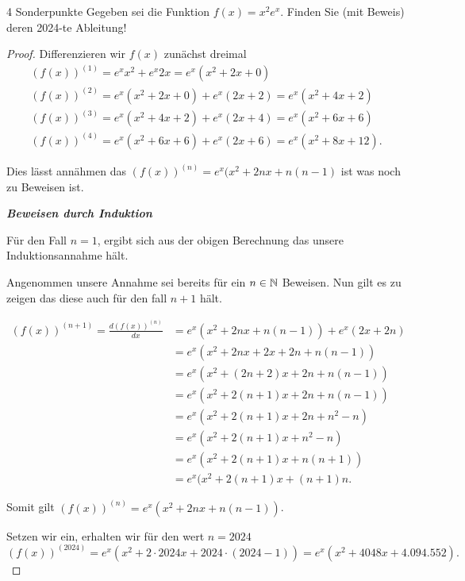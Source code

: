 \documentclass{problemset}
\begin{document}
\begin{problem}{4 Sonderpunkte}
Gegeben sei die Funktion $f(x) = x^2 e^x$. Finden Sie (mit Beweis) deren 2024-te Ableitung!

\begin{proof}
    Differenzieren wir $f(x)$ zunächst dreimal
    \begin{align*}
        (f(x))^{(1)} = e^xx^2 + e^x2x = e^x(x^2 + 2x + 0)                  \\
        (f(x))^{(2)} = e^x(x^2 + 2x + 0) + e^x(2x + 2) = e^x(x^2 + 4x + 2) \\
        (f(x))^{(3)} = e^x(x^2 + 4x + 2) + e^x(2x + 4) = e^x(x^2 + 6x + 6) \\
        (f(x))^{(4)} = e^x(x^2 + 6x + 6) + e^x(2x + 6) = e^x(x^2 + 8x + 12).
    \end{align*}

    Dies lässt annähmen das $(f(x))^{(n)} = e^x(x^2 + 2nx + n(n-1)$ ist was
    noch zu Beweisen ist.

    \textbf{\textit{Beweisen durch Induktion}}

    Für den Fall $n = 1$, ergibt sich aus der obigen Berechnung das unsere
    Induktionsannahme hält.

    Angenommen unsere Annahme sei bereits für ein $n \in \mathbb{N}$ Beweisen. Nun
    gilt es zu zeigen das diese auch für den fall $n + 1$ hält.

    \begin{align*}
        (f(x))^{(n + 1)} = \frac{d (f(x))^{(n)}}{dx} & = e^x(x^2 + 2nx + n(n-1)) + e^x(2x + 2n) \\
                                                     & = e^x(x^2 + 2nx + 2x + 2n + n(n-1))      \\
                                                     & = e^x(x^2 + (2n + 2)x + 2n + n(n-1))     \\
                                                     & = e^x(x^2 + 2(n + 1)x + 2n + n(n-1))     \\
                                                     & = e^x(x^2 + 2(n + 1)x + 2n + n^2 -n)     \\
                                                     & = e^x(x^2 + 2(n + 1)x + n^2 - n)         \\
                                                     & = e^x(x^2 + 2(n + 1)x + n(n + 1))        \\
                                                     & = e^x(x^2 + 2(n + 1)x + (n + 1)n.
    \end{align*}

    Somit gilt $(f(x))^{(n)} = e^x(x^2 + 2nx + n(n-1))$.

    Setzen wir ein, erhalten wir für den wert $n = 2024$
    \[
        (f(x))^{(2024)} = e^x(x^2 + 2 \cdot 2024x + 2024 \cdot (2024 - 1)) = e^x(x^2 + 4048x + 4.094.552).
    \]

\end{proof}
\end{problem}
\end{document}
